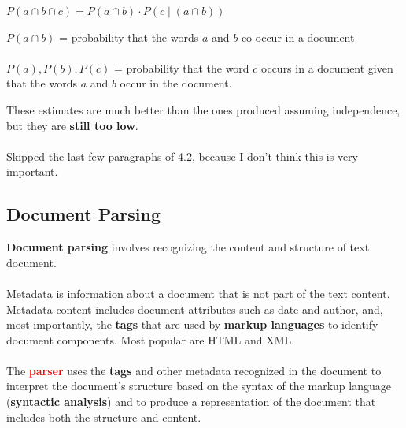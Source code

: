 \begin{minipage}{.5\textwidth}
$P(a \cap b \cap c)=P(a \cap b) \cdot P(c \mid(a \cap b))$
\end{minipage}
\begin{minipage}{.45\textwidth}
$P(a \cap b)$ = probability that the words $a$ and $b$ \textcolor{NavyBlue}{co-occur} in a document \\
\\
$P(a), P(b), P(c)$ =  probability that the word $c$ occurs in a document given that the words $a$ and $b$ occur in the document.
\end{minipage}
\vspace{0.25cm}

These estimates are much better than the ones produced assuming independence, but they are \textbf{still too low}.
\\
\\
Skipped the last few paragraphs of 4.2, because I don't think this is very important.
\newpage

\subsection{Document Parsing}
\textbf{Document parsing} involves recognizing the content and structure of text document.
\\
\\
Metadata is information about a document that is not part of the text content. Metadata content includes document attributes such as date and author, and, most importantly, the \textbf{tags} that are used by \textbf{markup languages} to identify document components. Most popular are HTML and XML.
\\
\\
The \textbf{\textcolor{Red}{parser}} uses the \textbf{tags} and other metadata recognized in the document to interpret the document’s structure based on the syntax of the markup language (\textbf{\textcolor{NavyBlue}{syntactic analysis}}) and to produce a representation of the document that includes both the structure and content. 
